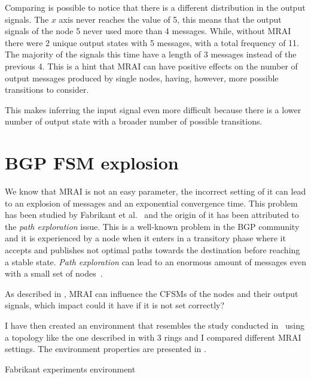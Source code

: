 Comparing  is possible to notice
that there is a different distribution in the output signals.
The $x$ axis never reaches the value of \num{5}, this means that the output signals
of the node \num{5} never used more than \num{4} messages.
While, without \ac{MRAI} there were \num{2} unique output states with \num{5}
messages, with a total frequency of \num{11}.
The majority of the signals this time have a length of \num{3} messages instead of
the previous \num{4}.
This is a hint that \ac{MRAI} can have positive effects on the number of output messages
produced by single nodes, having, however, more possible transitions to consider.

This makes inferring the input signal even more difficult because there is a lower
number of output state with a broader number of possible transitions.

\section{BGP FSM explosion}
\label{sec:bgp_fsm_explosion}

We know that \ac{MRAI} is not an easy parameter, the incorrect setting of
it can lead to an explosion of messages and an exponential convergence time.
This problem has been studied by Fabrikant et al.~\cite{fabrikant2011there} and
the origin of it has been attributed to the \textit{path exploration} issue.
This is a well-known problem in the \ac{BGP} community and it is experienced
by a node when it enters in a transitory phase where it accepts and publishes not
optimal paths towards the destination before reaching a stable state.
\textit{Path exploration} can lead to an enormous amount of messages even with
a small set of nodes~\cite{deshpande2004impact}.

As described in , \ac{MRAI} can influence the
\ac{CFSM}s of the nodes and their output signals, which impact could it have
if it is not set correctly?

I have then created an environment that resembles the study conducted in~\cite{fabrikant2011there}
using a topology like the one described in 
with \num{3} rings and I compared different \ac{MRAI} settings.
The environment properties are presented in .

\begin{table}[h]
	
	\caption{Fabrikant experiments environment}
	\label{tbl:fabrikant_environment}
\end{table}

